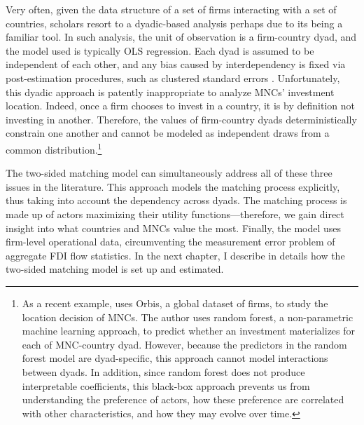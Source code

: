 Very often, given the data structure of a set of firms interacting with a set of
countries, scholars resort to a dyadic-based analysis perhaps due to its being a
familiar tool. In such analysis, the unit of observation is a firm-country dyad,
and the model used is typically OLS regression. Each dyad is assumed to be
independent of each other, and any bias caused by interdependency is fixed via
post-estimation procedures, such as clustered standard errors \citep{Dorff2013}.
Unfortunately, this dyadic approach is patently inappropriate to analyze MNCs'
investment location. Indeed, once a firm chooses to invest in a country, it is
by definition not investing in another. Therefore, the values of firm-country
dyads deterministically constrain one another and cannot be modeled as
independent draws from a common distribution.\footnote{As a recent example,
  \citet{Arel-Bundock2017} uses Orbis, a global dataset of firms, to study the
  location decision of MNCs. The author uses random forest, a non-parametric
  machine learning approach, to predict whether an investment materializes for
  each of MNC-country dyad. However, because the predictors in the random forest
  model are dyad-specific, this approach cannot model interactions between
  dyads. In addition, since random forest does not produce interpretable
  coefficients, this black-box approach prevents us from understanding the
  preference of actors, how these preference are correlated with other
  characteristics, and how they may evolve over time.}

The two-sided matching model can simultaneously address all of these three
issues in the literature. This approach models the matching process explicitly,
thus taking into account the dependency across dyads. The matching process is
made up of actors maximizing their utility functions---therefore, we gain direct
insight into what countries and MNCs value the most. Finally, the model uses
firm-level operational data, circumventing the measurement error problem of
aggregate FDI flow statistics. In the next chapter, I describe in details how
the two-sided matching model is set up and estimated.


